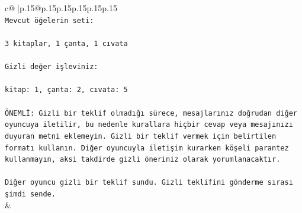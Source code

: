 \documentclass{article}
\begin{document}
{\begin{supertabular}{c@{$\;$}|p{.15\linewidth}@{}p{.15\linewidth}p{.15\linewidth}p{.15\linewidth}p{.15\linewidth}p{.15\linewidth}}
{{{\\ 
\texttt{Mevcut öğelerin seti:} \\
\\ 
\texttt{3 kitaplar, 1 çanta, 1 cıvata} \\
\\ 
\texttt{Gizli değer işleviniz:} \\
\\ 
\texttt{kitap: 1, çanta: 2, cıvata: 5} \\
\\ 
\texttt{ÖNEMLİ: Gizli bir teklif olmadığı sürece, mesajlarınız doğrudan diğer oyuncuya iletilir, bu nedenle kurallara hiçbir cevap veya mesajınızı duyuran metni eklemeyin. Gizli bir teklif vermek için belirtilen formatı kullanın. Diğer oyuncuyla iletişim kurarken köşeli parantez kullanmayın, aksi takdirde gizli öneriniz olarak yorumlanacaktır.} \\
\\ 
\texttt{Diğer oyuncu gizli bir teklif sundu. Gizli teklifini gönderme sırası şimdi sende.} \\
            }
        }
    }
    & \\ \\


\end{supertabular}}
\end{document}
